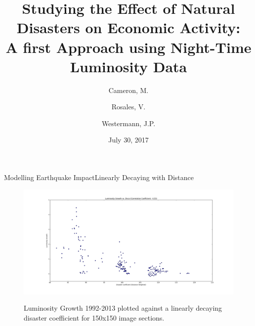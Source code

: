 \documentclass{beamer}
\title{
  Studying the Effect of Natural Disasters on Economic Activity:\\
  \large{A first Approach using Night-Time Luminosity Data}
}
\author{Cameron, M. \and Rosales, V. \and Westermann, J.P.}
\date{July 30, 2017}
\begin{document}
\begin{frame}
  \maketitle
\end{frame}

\begin{frame}{Modelling Earthquake Impact}{Linearly Decaying with Distance}
  \begin{figure}
    \centering
    \includegraphics[height=1\paperheight]{linear-lum-vs-disco}\label{fig:linear-model-disco-vs-lum-growth} %
    \caption{Luminosity Growth 1992-2013 plotted against a linearly decaying disaster coefficient for 150x150 image sections.}
  \end{figure}
\end{frame}

\end{document}
